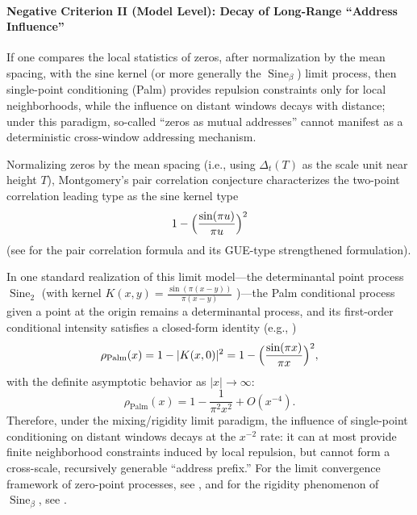 \paragraph{Negative Criterion II (Model Level): Decay of Long-Range ``Address Influence''}
If one compares the local statistics of zeros, after normalization by the mean spacing, with the sine kernel (or more generally the \(\operatorname{Sine}_\beta\)) limit process, then single-point conditioning (Palm) provides repulsion constraints only for local neighborhoods, while the influence on distant windows decays with distance; under this paradigm, so-called ``zeros as mutual addresses'' cannot manifest as a deterministic cross-window addressing mechanism.
\begin{remark}\label{rem:xi-addressability-palm-decay}
Normalizing zeros by the mean spacing (i.e., using \(\Delta_t(T)\) as the scale unit near height \(T\)), Montgomery's pair correlation conjecture characterizes the two-point correlation leading type as the sine kernel type
\[
1-\Bigl(\frac{\sin(\pi u)}{\pi u}\Bigr)^2
\]
(see \cite{Montgomery1973PairCorrelation} for the pair correlation formula and its GUE-type strengthened formulation).
\par
In one standard realization of this limit model---the determinantal point process \(\operatorname{Sine}_2\) (with kernel
\(
K(x,y)=\frac{\sin(\pi(x-y))}{\pi(x-y)}
\)
)---the Palm conditional process given a point at the origin remains a determinantal process, and its first-order conditional intensity satisfies a closed-form identity (e.g., \cite[Chapter~4]{HoughKrishnapurPeresVirag2009GAFDPP})
\[
\rho_{\mathrm{Palm}}(x)=1-|K(x,0)|^2
=1-\Bigl(\frac{\sin(\pi x)}{\pi x}\Bigr)^2,
\]
with the definite asymptotic behavior as \(|x|\to\infty\):
\[
\rho_{\mathrm{Palm}}(x)=1-\frac{1}{\pi^2x^2}+O(x^{-4}).
\]
Therefore, under the mixing/rigidity limit paradigm, the influence of single-point conditioning on distant windows decays at the \(x^{-2}\) rate: it can at most provide finite neighborhood constraints induced by local repulsion, but cannot form a cross-scale, recursively generable ``address prefix.''
For the limit convergence framework of zero-point processes, see \cite{AriasDeReynaRodgers2024ConvergencePointsZetaZeros}, and for the rigidity phenomenon of \(\operatorname{Sine}_\beta\), see \cite{ChhaibiNajnudel2018RigiditySineBeta}.
\end{remark}

